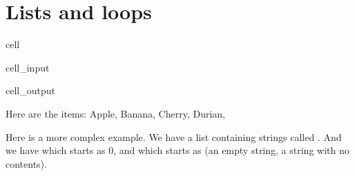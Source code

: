 \documentclass[letterpaper,10pt,english]{jupyterBook}
\begin{document}
\section{Lists and loops}
\label{\detokenize{loops:lists-and-loops}}
\begin{sphinxuseclass}{cell}\begin{sphinxVerbatimInput}

\begin{sphinxuseclass}{cell_input}
\begin{sphinxVerbatim}[commandchars=\\\{\}]
  \PYG{p}{[}\PYG{p}{]}
  
  
   
        \PYG{p}{[}\PYG{p}{]}  
        

  
\end{sphinxVerbatim}

\end{sphinxuseclass}\end{sphinxVerbatimInput}
\begin{sphinxVerbatimOutput}

\begin{sphinxuseclass}{cell_output}
\begin{sphinxVerbatim}[commandchars=\\\{\}]
Here are the items: Apple, Banana, Cherry, Durian, 
\end{sphinxVerbatim}

\end{sphinxuseclass}\end{sphinxVerbatimOutput}

\end{sphinxuseclass}
\sphinxAtStartPar
Here is a more complex example. We have a list containing strings called . And we have  which starts as 0, and  which starts as  (an empty string, a string with no contents).
\end{document}
